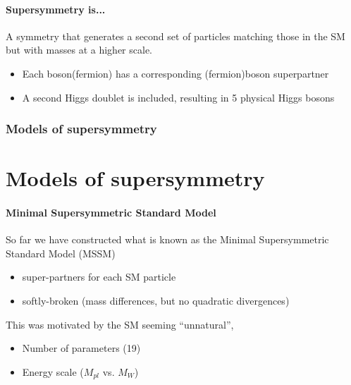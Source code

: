\documentclass{beamer}
\begin{document}
\subsection{Supersymmetry is...}
\begin{frame}{\insertsubsection}
A symmetry that generates a second set of particles matching those in the SM
but with masses at a higher scale.
\begin{itemize}
  \item Each boson(fermion) has a corresponding (fermion)boson superpartner
  \item A second Higgs doublet is included, resulting in 5 physical Higgs bosons
\end{itemize}

\end{frame}

\section{Models of supersymmetry}
\part{Models of supersymmetry}
\frame{\partpage}
\subsection{Minimal Supersymmetric Standard Model}
\begin{frame}{\insertsubsection}
  So far we have constructed what is known as the Minimal Supersymmetric
  Standard Model (MSSM)   
  \begin{itemize}
    \item super-partners for each SM particle
    \item softly-broken (mass differences, but no quadratic divergences)
  \end{itemize}
  This was motivated by the SM seeming ``unnatural'',
  \begin{itemize}
    \item  Number of parameters (19)
    \item  Energy scale ($M_{pl}$ vs. $M_{W}$)
  \end{itemize}
\end{frame}
\end{document}
